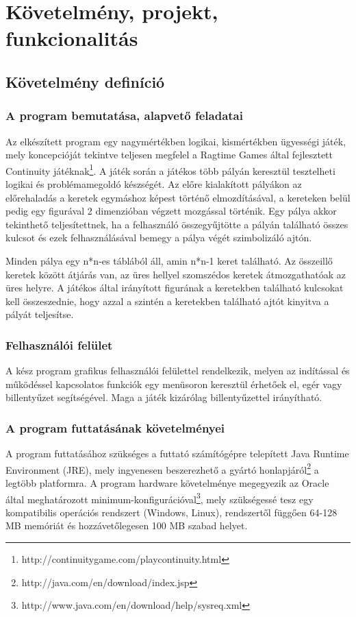 



\fedlap
\tableofcontents

\addtocounter{section}{1}
\section{Követelmény, projekt, funkcionalitás}

\subsection{Követelmény definíció}

    \subsubsection{A program bemutatása, alapvető feladatai}
Az elkészített program egy nagymértékben logikai, kismértékben ügyességi játék, mely koncepcióját tekintve teljesen megfelel a Ragtime Games által fejlesztett Continuity játéknak\footnote{http://continuitygame.com/playcontinuity.html}. A játék során a játékos több pályán keresztül tesztelheti logikai és problémamegoldó készségét. Az előre kialakított pályákon az előrehaladás a keretek egymáshoz képest történő elmozdításával, a kereteken belül pedig egy figurával 2 dimenzióban végzett mozgással történik. Egy pálya akkor tekinthető teljesítettnek, ha a felhasználó összegyűjtötte a pályán található összes kulcsot és ezek felhasználásával bemegy a pálya végét szimbolizáló ajtón.

Minden pálya egy n*n-es táblából áll, amin n*n-1 keret található. Az összeillő keretek között átjárás van, az üres hellyel szomszédos keretek átmozgathatóak az üres helyre. A játékos által irányított figurának a keretekben található kulcsokat kell összeszednie, hogy azzal a szintén a keretekben található ajtót kinyitva a pályát teljesítse.

    \subsubsection{Felhasználói felület}
A kész program grafikus felhasználói felülettel rendelkezik, melyen az indítással és működéssel kapcsolatos funkciók egy menüsoron keresztül érhetőek el, egér vagy billentyűzet segítségével. Maga a játék kizárólag billentyűzettel irányítható.

    \subsubsection{A program futtatásának követelményei}
A program futtatásához szükséges a futtató számítógépre telepített Java Runtime Environment (JRE), mely ingyenesen beszerezhető a gyártó honlapjáról\footnote{http://java.com/en/download/index.jsp} a legtöbb platformra. A program hardware követelménye megegyezik az Oracle által meghatározott minimum-konfigurációval\footnote{http://www.java.com/en/download/help/sysreq.xml}, mely szükségessé tesz egy kompatibilis operációs rendszert (Windows, Linux), rendszertől függően 64-128 MB memóriát és hozzávetőlegesen 100 MB szabad helyet.

